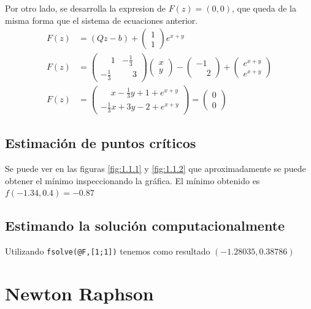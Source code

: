 \documentclass{endm}
\begin{document}
Por otro lado, se desarrolla la expresion de $F(z) = (0,0)$, que queda de la misma forma que el sistema de ecuaciones anterior.
\begin{align}
    F(z) &= (Qz - b) + \left(\begin{matrix} 1\\1 \end{matrix}\right)e^{x+y}
    \\
    F(z) &= \begin{pmatrix} \phantom{-}1 & -\frac{1}{3} \\ -\frac{1}{3} & \phantom{-}3\end{pmatrix} \begin{pmatrix} x\\y \end{pmatrix}
    -\begin{pmatrix} -1\\\phantom{-}2 \end{pmatrix} + \begin{pmatrix} e^{x+y}\\e^{x+y} \end{pmatrix}
    \\
    F(z) &= \begin{pmatrix} \phantom{-}x -\frac{1}{3}y + 1 +e^{x+y} \\ -\frac{1}{3}x + 3y - 2 +e^{x+y} \end{pmatrix} = \begin{pmatrix} 0\\0 \end{pmatrix}
\end{align}
\subsection{Estimación de puntos críticos}
Se puede ver en las figuras  \ref{fig:1.1.1} y \ref{fig:1.1.2} que aproximadamente se puede obtener el mínimo inspeccionando la gráfica. El mínimo obtenido es $f(-1.34,0.4)= -0.87$

\subsection{Estimando la solución computacionalmente}
Utilizando \lstinline[style=mystyle]{fsolve(@F,[1;1])} tenemos como resultado $(-1.28035, 0.38786)$

\section{Newton Raphson}
\end{document}
